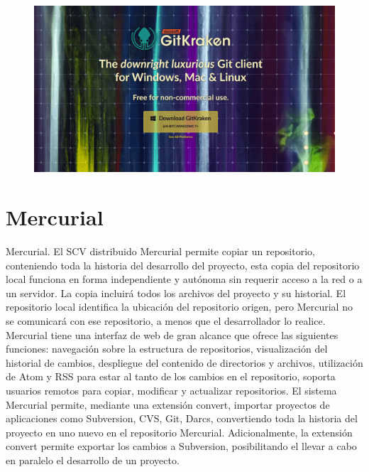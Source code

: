 \documentclass[12pt,letterpaper]{article}
\begin{document}
\vspace*{-0.025in}
\begin{figure}[htb]
\begin{center}
\includegraphics[width=16cm]{./Imagenes/4}
\end{center}
\end{figure}

\section{Mercurial}
Mercurial. El SCV distribuido Mercurial permite copiar un repositorio, conteniendo toda la historia del desarrollo del proyecto, esta copia del repositorio local funciona en forma independiente y autónoma sin requerir acceso a la red o a un servidor. La copia incluirá todos los archivos del proyecto y su historial. El repositorio local identifica la ubicación del repositorio origen, pero Mercurial no se comunicará con ese repositorio, a menos que el desarrollador lo realice. Mercurial tiene una interfaz de web de gran alcance que ofrece las siguientes funciones: navegación sobre la estructura de repositorios, visualización del historial de cambios, despliegue del contenido de directorios y archivos, utilización de Atom y RSS para estar al tanto de los cambios en el repositorio, soporta usuarios remotos para copiar, modificar y actualizar repositorios. El sistema Mercurial permite, mediante una extensión convert, importar proyectos de aplicaciones como Subversion, CVS, Git, Darcs, convertiendo toda la historia del proyecto en uno nuevo en el repositorio Mercurial. Adicionalmente, la extensión convert permite exportar los cambios a Subversion, posibilitando el llevar a cabo en paralelo el desarrollo de un proyecto.
\end{document}
